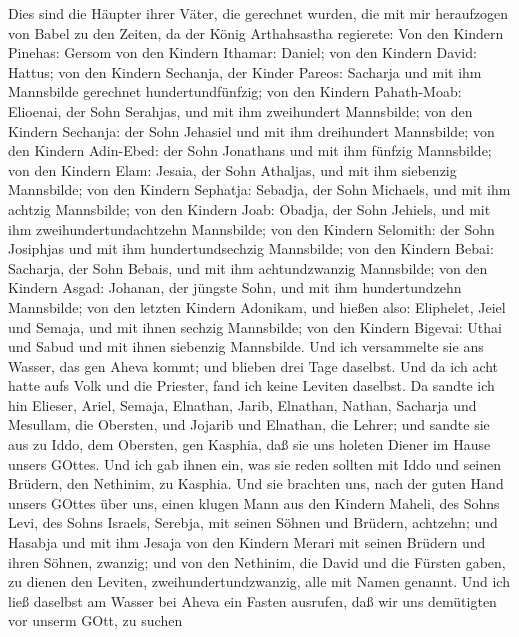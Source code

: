  Dies sind die Häupter ihrer Väter, die gerechnet wurden,
die mit mir heraufzogen von Babel zu den Zeiten, da der König
Arthahsastha regierete:  Von den Kindern Pinehas: Gersom von
den Kindern Ithamar: Daniel; von den Kindern David: Hattus; 
von den Kindern Sechanja, der Kinder Pareos: Sacharja und mit ihm
Mannsbilde gerechnet hundertundfünfzig;  von den Kindern
Pahath-Moab: Elioenai, der Sohn Serahjas, und mit ihm zweihundert
Mannsbilde;  von den Kindern Sechanja: der Sohn Jehasiel und
mit ihm dreihundert Mannsbilde;  von den Kindern Adin-Ebed:
der Sohn Jonathans und mit ihm fünfzig Mannsbilde;  von den
Kindern Elam: Jesaia, der Sohn Athaljas, und mit ihm siebenzig
Mannsbilde;  von den Kindern Sephatja: Sebadja, der Sohn
Michaels, und mit ihm achtzig Mannsbilde;  von den Kindern
Joab: Obadja, der Sohn Jehiels, und mit ihm zweihundertundachtzehn
Mannsbilde;  von den Kindern Selomith: der Sohn Josiphjas
und mit ihm hundertundsechzig Mannsbilde;  von den Kindern
Bebai: Sacharja, der Sohn Bebais, und mit ihm achtundzwanzig Mannsbilde;
 von den Kindern Asgad: Johanan, der jüngste Sohn, und mit
ihm hundertundzehn Mannsbilde;  von den letzten Kindern
Adonikam, und hießen also: Eliphelet, Jeiel und Semaja, und mit ihnen
sechzig Mannsbilde;  von den Kindern Bigevai: Uthai und
Sabud und mit ihnen siebenzig Mannsbilde.  Und ich
versammelte sie ans Wasser, das gen Aheva kommt; und blieben drei Tage
daselbst. Und da ich acht hatte aufs Volk und die Priester, fand ich
keine Leviten daselbst.  Da sandte ich hin Elieser, Ariel,
Semaja, Elnathan, Jarib, Elnathan, Nathan, Sacharja und Mesullam, die
Obersten, und Jojarib und Elnathan, die Lehrer;  und sandte
sie aus zu Iddo, dem Obersten, gen Kasphia, daß sie uns holeten Diener
im Hause unsers GOttes. Und ich gab ihnen ein, was sie reden sollten mit
Iddo und seinen Brüdern, den Nethinim, zu Kasphia.  Und sie
brachten uns, nach der guten Hand unsers GOttes über uns, einen klugen
Mann aus den Kindern Maheli, des Sohns Levi, des Sohns Israels, Serebja,
mit seinen Söhnen und Brüdern, achtzehn;  und Hasabja und
mit ihm Jesaja von den Kindern Merari mit seinen Brüdern und ihren
Söhnen, zwanzig;  und von den Nethinim, die David und die
Fürsten gaben, zu dienen den Leviten, zweihundertundzwanzig, alle mit
Namen genannt.  Und ich ließ daselbst am Wasser bei Aheva
ein Fasten ausrufen, daß wir uns demütigten vor unserm GOtt, zu suchen
